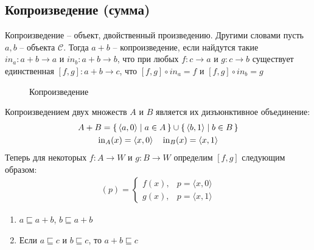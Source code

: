 


\subsection{Копроизведение (сумма)}
\begin{defn}
  Копроизведение -- объект, двойственный произведению. Другими словами
  пусть $a, b$ -- объекта $\mathcal{C}$. Тогда $a + b$ -- копроизведение, если
  найдутся такие $in_a \colon a + b \to a$ и $in_b \colon a + b \to b$, что при
  любых $f \colon c \to a$ и $g \colon c \to b$ существует единственная $[f, g]
  \colon a + b \to c$, что $[f, g] \circ in_a = f$ и $[f, g] \circ in_b = g$ 
\end{defn}
\begin{figure}[h]
  \centering
  \caption{Копроизведение}
  \label{fig:coproduct}
\end{figure}
\begin{exm}
  Копроизведением двух множеств $A$ и $B$ является их дизъюнктивное объединение:
  \begin{gather*}
    A + B = \{\, \langle {a, 0} \rangle \mid a \in A \,\}
      \cup \{\, \langle {b, 1} \rangle \mid b \in B \,\} \\
    \operatorname{in}_A(x) = \langle {x, 0} \rangle \quad
    \operatorname{in}_B(x) = \langle {x, 1} \rangle \\
  \end{gather*}
  Теперь для некоторых $f \colon A \to W$ и $g \colon B \to W$ определим $[f, g]$
  следующим образом:
  \begin{gather*}
    [f, g](p) = \begin{cases}
      f(x), & p = \langle {x, 0} \rangle \\
      g(x), & p = \langle {x, 1} \rangle
    \end{cases}
  \end{gather*}
\end{exm}
\begin{exm}
  \leavevmode
  \begin{enumerate}
    \item $a \sqsubseteq a + b$, $b \sqsubseteq a + b$
    \item Если $a \sqsubseteq c$ и $ b \sqsubseteq c$, то $ a + b \sqsubseteq c$
  \end{enumerate}
\end{exm}

